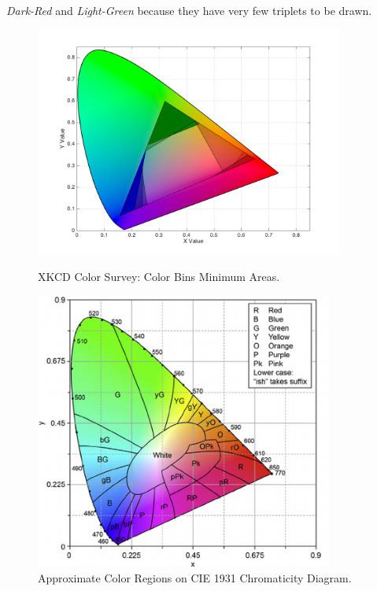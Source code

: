 \emph{Dark-Red} and \emph{Light-Green} because they have very few triplets to be drawn.
%
\begin{figure}[!htbp]
  \vspace{-15pt}
  \centering
  \begin{minipage}{0.54\textwidth}
    \centering
    \includegraphics[width=0.9\textwidth]{images/results/colorbins_areas.png}
    \caption[XKCD Color Survey: Color Bins Minimum Areas]{XKCD Color Survey: Color Bins Minimum Areas.}
    \label{fig:colorbins_areas}
  \end{minipage}\hfill
  \begin{minipage}{0.45\textwidth}
    \centering
    \includegraphics[width=0.87\textwidth]{images/results/cie_colors.png}
    \caption[Approximate Color Regions on CIE 1931 Chromaticity Diagram]{Approximate Color Regions on CIE 1931 Chromaticity Diagram. \cite{Fortner1997}}
    \label{fig:cie_colorregions}
  \end{minipage}
  \vspace{-15pt}
\end{figure} \par
